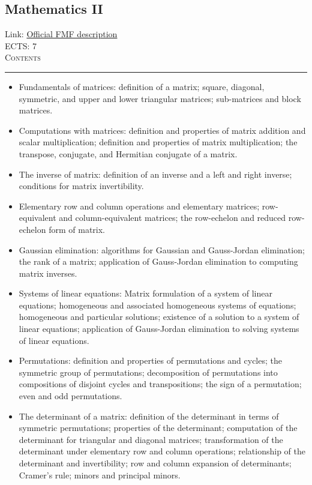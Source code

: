 \documentclass[11pt, a4paper]{article}
\newenvironment{course}[3]{
\subsection{#1}%
Link: \href{#2}{Official FMF description}\\%
ECTS: #3%
\vspace{1ex}
\\
{\large \textsc{Contents}}\\[-0.9ex]%
\rule{\textwidth}{0.5pt}
\vspace{-3ex}
}
{}
\newenvironment{chapter}[1]{
\begin{tcolorbox}[title=#1, breakable]
}
{\end{tcolorbox}}
\begin{document}
\begin{course}{Mathematics II}{https://www.fmf.uni-lj.si/en/study-physics/programmes/1fiz/2020/7000777/courses/521/}{7}
    \label{mathematics_2}

    \begin{chapter}{Matrices}
        \begin{itemize}
        
            \item Fundamentals of matrices: definition of a matrix; square, diagonal, symmetric, and upper and lower triangular matrices;
            sub-matrices and block matrices.

            \item Computations with matrices: definition and properties of matrix addition and scalar multiplication; definition and properties of matrix multiplication;
            the transpose, conjugate, and Hermitian conjugate of a matrix.

            \item The inverse of matrix: definition of an inverse and a left and right inverse; conditions for matrix invertibility.

            \item Elementary row and column operations and elementary matrices; row-equivalent and column-equivalent matrices; the row-echelon and reduced row-echelon form of matrix.
            
            \item Gaussian elimination: algorithms for Gaussian and Gauss-Jordan elimination; the rank of a matrix; application of Gauss-Jordan elimination to computing matrix inverses.

            \item Systems of linear equations: Matrix formulation of a system of linear equations; homogeneous and associated homogeneous systems of equations; homogeneous and particular solutions; existence of a solution to a system of linear equations; application of Gauss-Jordan elimination to solving systems of linear equations.

            \item Permutations: definition and properties of permutations and cycles; the symmetric group of permutations; decomposition of permutations into compositions of disjoint cycles and transpositions; the sign of a permutation; even and odd permutations.

            \item The determinant of a matrix: definition of the determinant in terms of symmetric permutations; properties of the determinant; computation of the determinant for triangular and diagonal matrices; transformation of the determinant under elementary row and column operations; relationship of the determinant and invertibility; row and column expansion of determinants; Cramer's rule; minors and principal minors.
        

\end{itemize}
\end{chapter}
\end{course}
\end{document}
